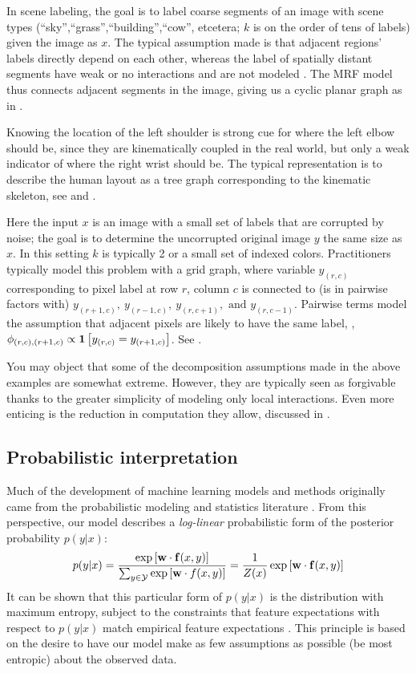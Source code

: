  In scene labeling, the goal is to label coarse segments 
of an image with scene types (``sky'',``grass'',``building'',``cow'', etcetera; 
$k$ is on the order of tens of labels) given the image as $x$. The typical 
assumption made is that adjacent regions' labels directly depend on each other, 
whereas the label of spatially distant segments have weak or no interactions 
and are not modeled \citep{cour05}.  The MRF model thus connects adjacent 
segments in the image, giving us a cyclic planar graph as in
.

  Knowing the location of the left shoulder is 
strong cue for where the left elbow should be, since they are kinematically 
coupled in the real world, but only a weak indicator of where the right wrist 
should be.  The typical representation is to describe the human layout as a 
tree graph corresponding to the kinematic skeleton, 
see  and .


 Here the input $x$ is an image with a small set of 
labels that are corrupted by noise; the goal is to determine the uncorrupted 
original image $y$ the same size as $x$.  In this setting $k$ is typically 2 or 
a small set of indexed colors. Practitioners typically model this problem with 
a grid graph, where variable $y_{(r,c)}$ corresponding to pixel label at row 
$r$, column $c$ is connected to (is in pairwise factors with) 
$y_{(r+1,c)},~y_{(r-1,c)},~y_{(r,c+1)}, \text{ and } y_{(r,c-1)}$.  Pairwise 
terms model the assumption that adjacent pixels are likely to have the same 
label, \eg, $\phi_{(r,c),(r+1,c)} \propto \mathbf{1}\left[y_{(r,c)} = y_{(r+1,c)}\right]$. See 
.

You may object that some of the decomposition assumptions made in the above 
examples are somewhat extreme.  However, they are typically seen as forgivable 
thanks to the greater simplicity of modeling only local interactions. Even more 
enticing is the reduction in computation they allow, discussed in 
.

\subsection{Probabilistic interpretation}\label{sec:probinterp}
Much of the development of machine learning models and methods originally came 
from the probabilistic modeling and statistics literature 
\citep{koller-book,esl-book,bishop-book}.  From this perspective, our model 
describes a {\em log-linear} probabilistic form of the posterior probability 
$p(y|x)$:
\begin{equation}
p(y|x)= \frac{\exp \left[ \mathbf{w} \cdot \mathbf{f}(x,y) \right]}{\sum_{y \in \mathcal{Y}} \exp \left[\mathbf{w} \cdot f(x,y) \right]} = \frac{1}{Z(x)} \exp \left[ \mathbf{w} \cdot \mathbf{f}(x,y) \right]
\end{equation}
It can be shown that this particular form of $p(y|x)$ is the
distribution with maximum entropy, subject to the constraints that feature 
expectations with respect to $p(y|x)$ match empirical feature expectations 
\citep{jaynes1963}.  This principle is based on the desire to have our model 
make as few assumptions as possible (be most entropic) about the observed data.

